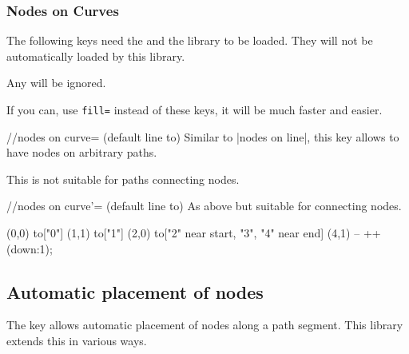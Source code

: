 \begin{multicols}{2}
\subsubsection{Nodes on Curves}
The following keys need the 
and the  \cite{spath3}
library to be loaded. They will not be automatically
loaded by this library.

Any  will be ignored.

If you can, use \texttt{fill=}
instead of these keys, it will be much faster and easier.

\begin{stylekey}{/\tikzext/nodes on curve= (default line to)}
Similar to |nodes on line|, this key allows
to have nodes on arbitrary paths.

This is not suitable for paths connecting nodes.
\end{stylekey}

\begin{stylekey}{/\tikzext/nodes on curve'= (default line to)}
As above but suitable for connecting nodes.
\end{stylekey}

\begin{codeexample}[preamble=\usetikzlibrary{ext.nodes, intersections, quotes, spath3}]
\end{codeexample}
\begin{codeexample}[preamble=\usetikzlibrary{ext.nodes, intersections, quotes, spath3}]
\tikz[inner sep=.15em, circle, nodes={draw, green}, sloped, ultra thick]
  \draw[->, ext/nodes on curve=bend left] (0,0) to["0"] (1,1)
                                                to["1"] (2,0)
                  to["2" near start, "3", "4" near end] (4,1)
                                                -- ++(down:1);
\end{codeexample}
\newcolumn

\subsection{Automatic placement of nodes}
The  key allows automatic placement of
nodes along a path segment.
This library extends this in various ways.


\end{multicols}
